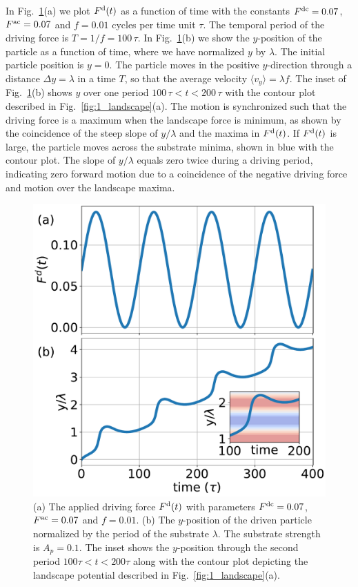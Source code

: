 \documentclass[preprint,showpacs,preprintnumbers,amsmath,amssymb,aps,prb]{revtex4-1}
\theoremstyle{remark}
\begin{document}
In Fig.~\ref{fig:2_Fd_vy_time}(a)
we plot $F^{\rm d}(t)$ 
as a function of time with the
constants $F^{\rm dc}=0.07$, 
$F^{\rm ac}=0.07$ and $f=0.01$ cycles per time unit $\tau$.
The temporal period of the driving force is
$T = 1/f = 100\,\tau$.
In Fig.~\ref{fig:2_Fd_vy_time}(b) 
we show the $y$-position of the particle
as a function of time,
where we have
normalized $y$ by $\lambda$.
The initial particle position is $y = 0$. 
The particle moves
in the positive $y$-direction
through a distance $\Delta y = \lambda$  in a time $T$,
so that  
the average velocity 
$\langle {v}_y \rangle = \lambda f$. 
The inset of Fig.~\ref{fig:2_Fd_vy_time}(b)
shows $y$ 
over one period $100\,\tau < t < 200\,\tau$
with 
the contour plot described
in Fig.~\ref{fig:1_landscape}(a).
The motion is synchronized such that the 
driving force is a maximum when the landscape 
force is minimum,
as shown by the coincidence of the
steep slope of 
$y/\lambda$ 
and the maxima in $F^{\rm d}(t)$.
If $F^{\rm d}(t)$ is large,
the particle moves across the substrate minima,
shown in blue with the contour plot.
The slope of $y/\lambda$ equals zero twice
during a driving period,
indicating zero
forward motion 
due to a coincidence of the negative
driving force and motion over the landscape maxima.
\begin{figure}[h]
\centering
\includegraphics[width=\columnwidth]{fig2_Fd_vy_time.pdf}
\caption{(a) The applied driving force $F^{\rm d}(t)$ 
  with parameters $F^{\rm dc} = 0.07$, $F^{\rm ac} = 0.07$ and $f=0.01$.
  (b) 
  The $y$-position of the driven particle
  normalized by the period of the substrate $\lambda$.
  The substrate strength is $A_p=0.1$.
  The inset   shows
  the $y$-position
  through the second period $100\tau<t<200\tau$
 along with the contour plot depicting
  the landscape potential described in Fig.~\ref{fig:1_landscape}(a).
  }
\label{fig:2_Fd_vy_time}
\end{figure}
\end{document}
